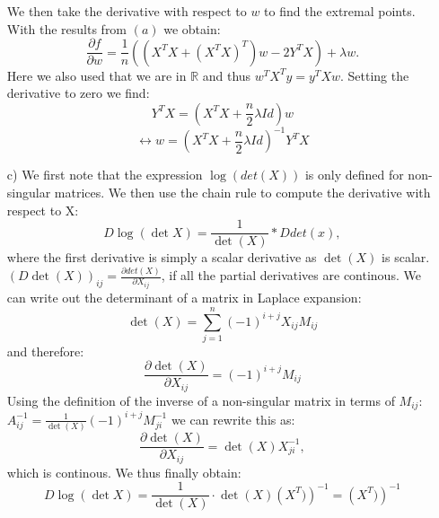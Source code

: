 \documentclass[10pt]{article}
\numberwithin{equation}{section}
\begin{document}
\begin{enumerate}
{$$$$
We then take the derivative with respect to $w$ to find the extremal points. With the results from $(a)$ we obtain:
$$
\frac{\partial f}{\partial w}=\frac{1}{n}( (X^TX + {(X^TX)}^T) w - 2Y^TX) + \lambda w.
$$
Here we also used that we are in $\mathbb{R}$ and thus $w^T X^Ty = y^TXw$. 
Setting the derivative to zero we find:
$$
Y^TX = \left( X^TX + \frac{n}{2}\lambda Id \right) w 
$$
$$
\leftrightarrow w = \left( X^TX + \frac{n}{2}\lambda Id \right)^{-1} Y^TX
$$}
\item[c)] {
We first note that the expression $\log(det(X))$ is only defined for non-singular matrices.
We then use the chain rule to compute the derivative with respect to X:
$$D \log(\det{X}) = \frac{1}{\det(X)} * D det(x),$$
where the first derivative is simply a scalar derivative as $\det(X)$ is scalar.
$\left(D \det(X)\right)_{ij} = \frac{\partial det(X)}{\partial X_{ij}}$, if all the partial derivatives are continous.
We can write out the determinant of a matrix in Laplace expansion:
$$
\det(X)= \sum_{j=1}^n (-1)^{i+j} X_{ij} M_{ij}
$$
and therefore:
$$
\frac{\partial \det(X)}{\partial X_{ij}} = (-1)^{i+j} M_{ij}
$$
Using the definition of the inverse of a non-singular matrix in terms of $M_{ij}$: $A^{-1}_{ij}= \frac{1}{\det(X)} (-1)^{i+j}M^{-1}_{ji}$ we can rewrite this as: 
$$
\frac{\partial \det(X)}{\partial X_{ij}} = \det(X) X^{-1}_{ji},
$$
which is continous. 
We thus finally obtain:
$$
D \log(\det{X}) = \frac{1}{\det(X)} \cdot \det(X) \left(X^T)\right)^{-1} =\left(X^T)\right)^{-1}  $$
}
\end{enumerate}
\end{document}

